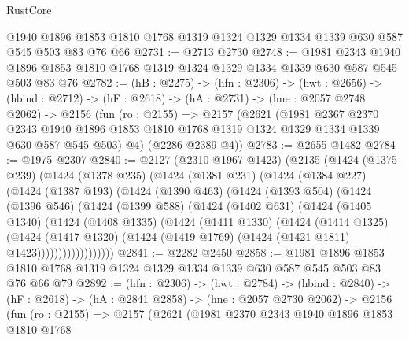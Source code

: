 \begin{lexlean}{RustCore}
\begin{coremodule}
    @1940
    @1896
    @1853
    @1810
    @1768
    @1319
    @1324
    @1329
    @1334
    @1339
    @630
    @587
    @545
    @503
    @83
    @76
    @66
@2731 := @2713 @2730
@2748 := @1981
    @2343
    @1940
    @1896
    @1853
    @1810
    @1768
    @1319
    @1324
    @1329
    @1334
    @1339
    @630
    @587
    @545
    @503
    @83
    @76
@2782 := (hB : @2275) ->
  (hfn : @2306) ->
  (hwt : @2656) ->
  (hbind : @2712) ->
  (hF : @2618) ->
  (hA : @2731) ->
  (hne : @2057 @2748 @2062) ->
  @2156
    (fun (ro : @2155) =>
    @2157
      (@2621
        (@1981
          @2367
          @2370
          @2343
          @1940
          @1896
          @1853
          @1810
          @1768
          @1319
          @1324
          @1329
          @1334
          @1339
          @630
          @587
          @545
          @503)
        @4)
      (@2286 @2389 @4))
@2783 := @2655 @1482
@2784 := @1975 @2307
@2840 := @2127
    (@2310 @1967 @1423)
    (@2135
      (@1424
        (@1375 @239)
        (@1424
          (@1378 @235)
          (@1424
            (@1381 @231)
            (@1424
              (@1384 @227)
              (@1424
                (@1387 @193)
                (@1424
                  (@1390 @463)
                  (@1424
                    (@1393 @504)
                    (@1424
                      (@1396 @546)
                      (@1424
                        (@1399 @588)
                        (@1424
                          (@1402 @631)
                          (@1424
                            (@1405 @1340)
                            (@1424
                              (@1408 @1335)
                              (@1424
                                (@1411 @1330)
                                (@1424
                                  (@1414 @1325)
                                  (@1424
                                    (@1417 @1320)
                                    (@1424
                                      (@1419 @1769)
                                      (@1424 (@1421 @1811) @1423))))))))))))))))))
@2841 := @2282 @2450
@2858 := @1981
    @1896
    @1853
    @1810
    @1768
    @1319
    @1324
    @1329
    @1334
    @1339
    @630
    @587
    @545
    @503
    @83
    @76
    @66
    @79
@2892 := (hfn : @2306) ->
  (hwt : @2784) ->
  (hbind : @2840) ->
  (hF : @2618) ->
  (hA : @2841 @2858) ->
  (hne : @2057 @2730 @2062) ->
  @2156
    (fun (ro : @2155) =>
    @2157
      (@2621
        (@1981
          @2370
          @2343
          @1940
          @1896
          @1853
          @1810
          @1768

\end{coremodule}
\end{lexlean}
